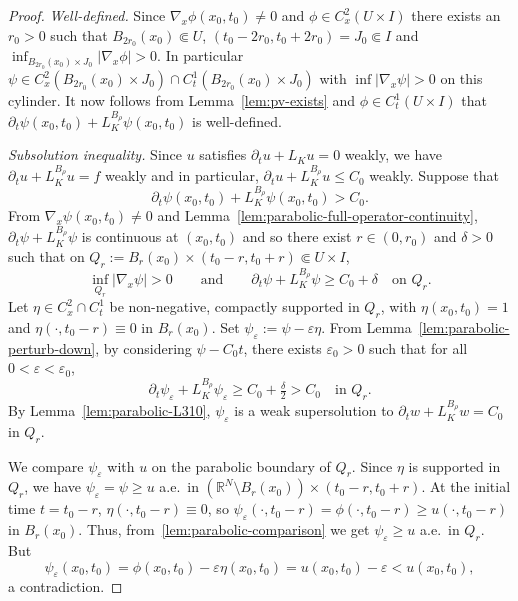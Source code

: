 \documentclass[11pt, a4paper, twoside]{article}
\theoremstyle{definition}
\theoremstyle{remark}
\newcommand{\R}{\mathbb{R}}
\begin{document}
\begin{proof}
\emph{Well-defined.} Since
$\nabla_x\phi(x_0,t_0) \neq 0$ and
$\phi \in C^2_x(U \times I)$ there exists an 
$r_0 > 0$ such that
$B_{2r_0}(x_0) \Subset U$, $(t_0-2r_0,t_0+2r_0) = J_0 \Subset I$  and
$\inf_{B_{2r_0}(x_0) \times J_0}|\nabla_x\phi| > 0$.
In particular $\psi \in C^2_x(B_{2r_0}(x_0) \times J_0)
\cap C^1_t(B_{2r_0}(x_0) \times J_0)$ with
$\inf|\nabla_x\psi| > 0$ on this cylinder.
It now follows from Lemma~\ref{lem:pv-exists} and $\phi \in  C^1_t(U \times I)$ that 
$\partial_t\psi(x_0,t_0) +L_K^{B_\rho}\psi(x_0,t_0)$ is well-defined. 

\emph{Subsolution inequality.} Since $u$ satisfies
$\partial_t u + L_K u = 0$ weakly, we have
$\partial_t u + L_K^{B_\rho} u = f$ weakly and in particular, $\partial_t u + L_K^{B_\rho} u \leq C_0$ weakly. 
Suppose that
\[
  \partial_t\psi(x_0,t_0)
  + L_K^{B_\rho}\psi(x_0,t_0) > C_0.
\]
From $ \nabla_x\psi(x_0,t_0) \neq 0$ and Lemma~\ref{lem:parabolic-full-operator-continuity},
$\partial_t\psi + L_K^{B_\rho}\psi$ is continuous at
$(x_0,t_0)$ and so there
exist $r \in (0,r_0)$ and $\delta > 0$ such that on
$Q_r := B_r(x_0) \times (t_0-r, t_0+r)
\Subset U \times I$,
\[
  \inf_{Q_r}|\nabla_x\psi| > 0
  \qquad \text{and} \qquad
  \partial_t\psi + L_K^{B_\rho}\psi
  \ge C_0 + \delta \quad \text{on } Q_r.
\]
Let $\eta \in C^2_x \cap C^1_t$ be non-negative,
compactly supported in $Q_r$, with $\eta(x_0,t_0) = 1$
and $\eta(\cdot,t_0-r) \equiv 0$ in $B_r(x_0)$.
Set $\psi_\varepsilon := \psi - \varepsilon\eta$.
From Lemma~\ref{lem:parabolic-perturb-down}, by considering $\psi-C_0t$, there exists
$\varepsilon_0 > 0$ such that for all
$0 < \varepsilon < \varepsilon_0$,
\[
  \partial_t\psi_\varepsilon
  + L_K^{B_\rho}\psi_\varepsilon
  \ge C_0 + \tfrac{\delta}{2} > C_0
  \quad \text{in } Q_r.
\]
By Lemma~\ref{lem:parabolic-L310},
$\psi_\varepsilon$ is a weak supersolution to
$\partial_t w + L_K^{B_\rho} w = C_0$ in $Q_r$.

We compare $\psi_\varepsilon$ with $u$ on the parabolic
boundary of $Q_r$. Since $\eta$ is supported in $Q_r$,
we have $\psi_\varepsilon = \psi \ge u$ a.e.\ in
$(\R^N \setminus B_r(x_0)) \times (t_0-r,t_0+r)$.
At the initial time $t = t_0-r$,
$\eta(\cdot,t_0-r) \equiv 0$, so
$\psi_\varepsilon(\cdot,t_0-r)
= \phi(\cdot,t_0-r) \ge u(\cdot,t_0-r)$ in $B_r(x_0)$.
Thus, from~\cref{lem:parabolic-comparison} we get
$\psi_\varepsilon \ge u$ a.e.\ in $Q_r$. But
\[
  \psi_\varepsilon(x_0,t_0)
  = \phi(x_0,t_0) - \varepsilon\eta(x_0,t_0)
  = u(x_0,t_0) - \varepsilon < u(x_0,t_0),
\]
a contradiction.
\end{proof}
\end{document}

